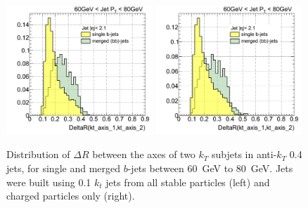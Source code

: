 \begin{figure}[tp]
\centering
\includegraphics[width=0.49\textwidth]{FIGS/TEMPFigs/PythisStandalone/Antikt4/minijets/DRkt2axes060.pdf}
\includegraphics[width=0.49\textwidth]{FIGS/TEMPFigs/PythisStandalone/Antikt4/chargedminijets/DRkt2axes060.pdf}
\caption{Distribution of $\Delta R$ between the axes of two $k_T$ subjets in anti-$k_T$ 0.4 jets, for single and merged $b$-jets between 60~GeV to 80~GeV. Jets were built using 0.1 $k_t$ jets from all stable particles (left) and charged particles only (right).}
\label{fig:pythiaDRktAllJetandChargedJet}
\end{figure}


